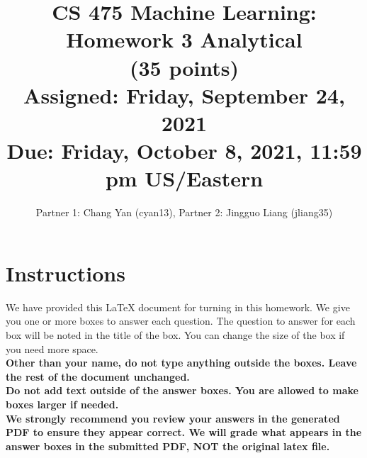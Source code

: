 \documentclass[11pt]{article}
\title{CS 475 Machine Learning: Homework 3 Analytical \\
(35 points)\\
\Large{Assigned: Friday, September 24, 2021} \\
\Large{Due: Friday, October 8, 2021, 11:59 pm US/Eastern}}
\author{Partner 1: Chang Yan (cyan13), Partner 2: Jingguo Liang  (jliang35)}
\date{}
\renewcommand{\vec}[1]{\mathbf{#1}}
\begin{document}
\maketitle
\thispagestyle{headings}

\section*{Instructions }
We have provided this \LaTeX{} document for turning in this homework. We give you one or more boxes to answer each question.  The question to answer for each box will be noted in the title of the box.  You can change the size of the box if you need more space.\\

{\bf Other than your name, do not type anything outside the boxes. Leave the rest of the document unchanged.}\\


\textbf{
  Do
  not add text outside of the answer boxes.  You are allowed to make boxes larger if needed.
  }\\


\textbf{We strongly recommend you review your answers in the generated PDF to
  ensure they appear correct. We will grade what appears in the answer boxes in
  the submitted PDF, NOT the original latex file.}

\end{document}
